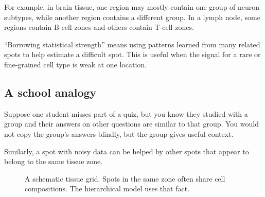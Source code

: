 \documentclass[11pt]{article}
\begin{document}
For example, in brain tissue, one region may mostly contain one group of neuron subtypes, while another region contains a different group. In a lymph node, some regions contain B-cell zones and others contain T-cell zones.

\begin{bigidea}
``Borrowing statistical strength'' means using patterns learned from many related spots to help estimate a difficult spot. This is useful when the signal for a rare or fine-grained cell type is weak at one location.
\end{bigidea}

\subsection{A school analogy}

Suppose one student misses part of a quiz, but you know they studied with a group and their answers on other questions are similar to that group. You would not copy the group's answers blindly, but the group gives useful context.

Similarly, a spot with noisy data can be helped by other spots that appear to belong to the same tissue zone.

\begin{figure}[H]
\centering
{}
\caption{A schematic tissue grid. Spots in the same zone often share cell compositions. The hierarchical model uses that fact.}
\end{figure}
\end{document}

